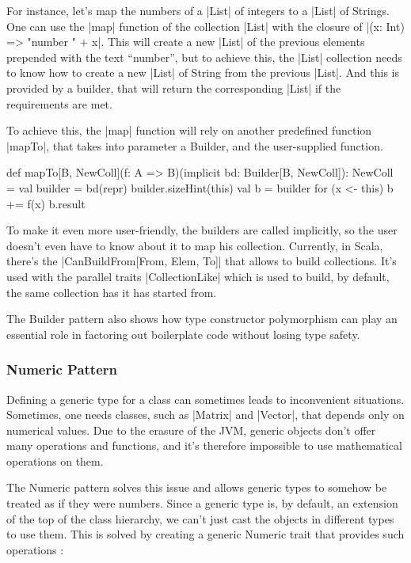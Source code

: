 For instance, let's map the numbers of a |List| of integers to a |List| of Strings. One can use the |map| function of the collection |List| with the closure of |(x: Int) => "number " + x|. This will create a new |List| of the previous elements prepended with the text ``number'', but to achieve this, the |List| collection needs to know how to create a new |List| of String from the previous |List|. And this is provided by a builder, that will return the corresponding |List| if the requirements are met.

To achieve this, the |map| function will rely on another predefined function |mapTo|, that takes into parameter a Builder, and the user-supplied function.

\begin{lstlisting-nobreak}
 def mapTo[B, NewColl](f: A => B)(implicit bd: Builder[B, NewColl]): NewColl = {
   val builder = bd(repr)
   builder.sizeHint(this)
   val b = builder
   for (x <- this) b += f(x)
   b.result
 }
\end{lstlisting-nobreak}

To make it even more user-friendly, the builders are called implicitly, so the user doesn't even have to know about it to map his collection. Currently, in Scala, there's the |CanBuildFrom[From, Elem, To]| that allows to build collections. It's used with the parallel traits |CollectionLike| which is used to build, by default, the same collection has it has started from.

The Builder pattern also shows how type constructor polymorphism can play an essential role in factoring out boilerplate code without losing type safety.\cite{adriaan}

\subsubsection{Numeric Pattern}

Defining a generic type for a class can sometimes leads to inconvenient situations. Sometimes, one needs classes, such as |Matrix| and |Vector|, that depends only on numerical values. Due to the erasure of the JVM, generic objects don't offer many operations and functions, and it's therefore impossible to use mathematical operations on them.

The Numeric pattern solves this issue and allows generic types to somehow be treated as if they were numbers. Since a generic type is, by default, an extension of the top of the class hierarchy, we can't just cast the objects in different types to use them. This is solved by creating a generic Numeric trait that provides such operations :

